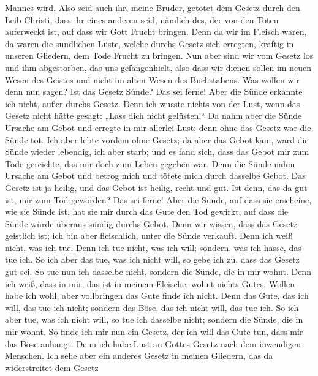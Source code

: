 Mannes wird.  Also seid auch ihr, meine Brüder, getötet dem
Gesetz durch den Leib Christi, dass ihr eines anderen seid, nämlich des,
der von den Toten auferweckt ist, auf dass wir Gott Frucht bringen.
 Denn da wir im Fleisch waren, da waren die sündlichen
Lüste, welche durchs Gesetz sich erregten, kräftig in unseren Gliedern,
dem Tode Frucht zu bringen.  Nun aber sind wir vom Gesetz
los und ihm abgestorben, das uns gefangenhielt, also dass wir dienen
sollen im neuen Wesen des Geistes und nicht im alten Wesen des
Buchstabens.  Was wollen wir denn nun sagen? Ist das Gesetz
Sünde? Das sei ferne! Aber die Sünde erkannte ich nicht, außer durchs
Gesetz. Denn ich wusste nichts von der Lust, wenn das Gesetz nicht hätte
gesagt: „Lass dich nicht gelüsten!{}``  Da nahm aber die
Sünde Ursache am Gebot und erregte in mir allerlei Lust; denn ohne das
Gesetz war die Sünde tot.  Ich aber lebte vordem ohne
Gesetz; da aber das Gebot kam, ward die Sünde wieder lebendig,
 ich aber starb; und es fand sich, dass das Gebot mir zum
Tode gereichte, das mir doch zum Leben gegeben war.  Denn
die Sünde nahm Ursache am Gebot und betrog mich und tötete mich durch
dasselbe Gebot.  Das Gesetz ist ja heilig, und das Gebot
ist heilig, recht und gut.  Ist denn, das da gut ist, mir
zum Tod geworden? Das sei ferne! Aber die Sünde, auf dass sie erscheine,
wie sie Sünde ist, hat sie mir durch das Gute den Tod gewirkt, auf dass
die Sünde würde überaus sündig durchs Gebot.  Denn wir
wissen, dass das Gesetz geistlich ist; ich bin aber fleischlich, unter
die Sünde verkauft.  Denn ich weiß nicht, was ich tue. Denn
ich tue nicht, was ich will; sondern, was ich hasse, das tue ich.
 So ich aber das tue, was ich nicht will, so gebe ich zu,
dass das Gesetz gut sei.  So tue nun ich dasselbe nicht,
sondern die Sünde, die in mir wohnt.  Denn ich weiß, dass
in mir, das ist in meinem Fleische, wohnt nichts Gutes. Wollen habe ich
wohl, aber vollbringen das Gute finde ich nicht.  Denn das
Gute, das ich will, das tue ich nicht; sondern das Böse, das ich nicht
will, das tue ich.  So ich aber tue, was ich nicht will, so
tue ich dasselbe nicht; sondern die Sünde, die in mir wohnt.
 So finde ich mir nun ein Gesetz, der ich will das Gute
tun, dass mir das Böse anhangt.  Denn ich habe Lust an
Gottes Gesetz nach dem inwendigen Menschen.  Ich sehe aber
ein anderes Gesetz in meinen Gliedern, das da widerstreitet dem Gesetz
